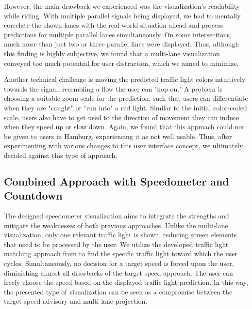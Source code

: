 However, the main drawback we experienced was the visualization's readability while riding. With multiple parallel signals being displayed, we had to mentally correlate the shown lanes with the real-world situation ahead and process predictions for multiple parallel lanes simultaneously. On some intersections, much more than just two or three parallel lines were displayed. Thus, although this finding is highly subjective, we found that a multi-lane visualization conveyed too much potential for user distraction, which we aimed to minimize.

Another technical challenge is moving the predicted traffic light colors intuitively towards the signal, resembling a flow the user can "hop on." A problem is choosing a suitable zoom scale for the prediction, such that users can differentiate when they are "caught" or "run into" a red light. Similar to the initial color-coded scale, users also have to get used to the direction of movement they can induce when they speed up or slow down. Again, we found that this approach could not be given to users in Hamburg, experiencing it as not well usable. Thus, after experimenting with various changes to this user interface concept, we ultimately decided against this type of approach.

\subsection{Combined Approach with Speedometer and Countdown}

The designed speedometer visualization aims to integrate the strengths and mitigate the weaknesses of both previous approaches. Unlike the multi-lane visualization, only one relevant traffic light is shown, reducing screen elements that need to be processed by the user. We utilize the developed traffic light matching approach from  to find the specific traffic light toward which the user cycles. Simultaneously, no decision for a target speed is forced upon the user, diminishing almost all drawbacks of the target speed approach. The user can freely choose the speed based on the displayed traffic light prediction. In this way, the presented type of visualization can be seen as a compromise between the target speed advisory and multi-lane projection.

